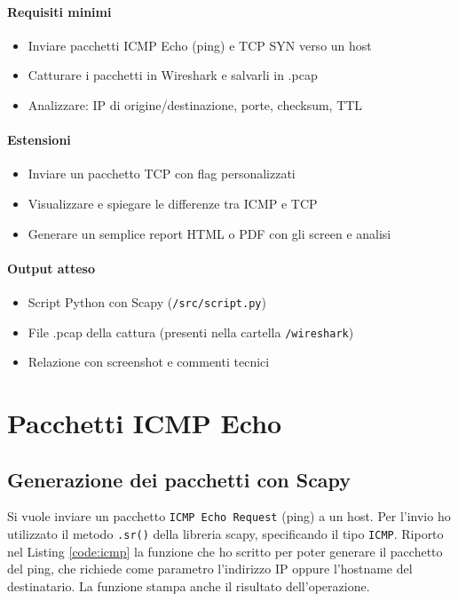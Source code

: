 \documentclass[12pt,a4paper]{report}
\begin{document}
\subsubsection{Requisiti minimi}
\begin{itemize}
	\item Inviare pacchetti ICMP Echo (ping) e TCP SYN verso un host
	\item Catturare i pacchetti in Wireshark e salvarli in .pcap
	\item Analizzare: IP di origine/destinazione, porte, checksum, TTL
\end{itemize}

\subsubsection{Estensioni}
\begin{itemize}
	\item Inviare un pacchetto TCP con flag personalizzati
	\item Visualizzare e spiegare le differenze tra ICMP e TCP
	\item Generare un semplice report HTML o PDF con gli screen e analisi
\end{itemize}

\subsubsection{Output atteso}

\begin{itemize}
	\item Script Python con Scapy (\texttt{/src/script.py})
	\item File .pcap della cattura (presenti nella cartella \texttt{/wireshark})
	\item Relazione con screenshot e commenti tecnici
\end{itemize}

\chapter{Pacchetti ICMP Echo}

\section{Generazione dei pacchetti con Scapy}

Si vuole inviare un pacchetto \texttt{ICMP Echo Request} (ping) a un host. Per l'invio ho utilizzato il metodo \texttt{.sr()} della libreria scapy, specificando il tipo \texttt{ICMP}. Riporto nel Listing \ref{code:icmp} la funzione che ho scritto per poter generare il pacchetto del ping, che richiede come parametro l'indirizzo IP oppure l'hostname del destinatario. La funzione stampa anche il risultato dell'operazione.
\end{document}

